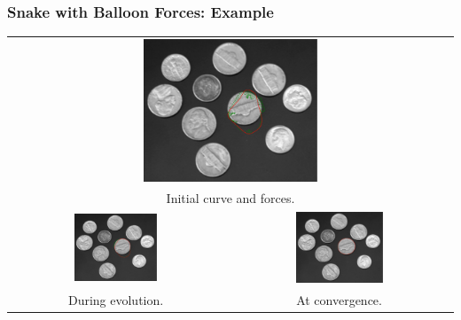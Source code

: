 \documentclass[10pt]{beamer}
\begin{document}
\begin{frame}
  \frametitle{Snake with Balloon Forces: Example}

  \begin{center}
    \begin{tabular}[h]{cc}
      \multicolumn{2}{c}{
        \includegraphics[width=0.4\textwidth]{IMAGES/SnakeInitialCurve}
      } \\
      \multicolumn{2}{c}{
        Initial curve and forces.
      } \\
      \includegraphics[width=0.4\textwidth]{IMAGES/SnakeDuringEvolution} &
      \includegraphics[width=0.4\textwidth]{IMAGES/SnakeAtConvergence} \\
      During evolution. & At convergence.
    \end{tabular}
  \end{center}
\end{frame}
\end{document}
